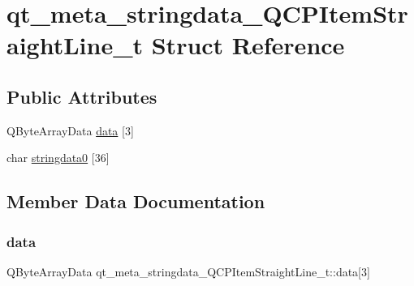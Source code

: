 \hypertarget{structqt__meta__stringdata__QCPItemStraightLine__t}{}\section{qt\+\_\+meta\+\_\+stringdata\+\_\+\+Q\+C\+P\+Item\+Straight\+Line\+\_\+t Struct Reference}
\label{structqt__meta__stringdata__QCPItemStraightLine__t}
\subsection*{Public Attributes}
\begin{DoxyCompactItemize}
\item 
Q\+Byte\+Array\+Data \mbox{\hyperlink{structqt__meta__stringdata__QCPItemStraightLine__t_a1b24e360df4ab7c0917a94969f909ba0}{data}} \mbox{[}3\mbox{]}
\item 
char \mbox{\hyperlink{structqt__meta__stringdata__QCPItemStraightLine__t_a0e2c6dce44cbc1e13041b33cd138f25d}{stringdata0}} \mbox{[}36\mbox{]}
\end{DoxyCompactItemize}


\subsection{Member Data Documentation}
\mbox{\label{structqt__meta__stringdata__QCPItemStraightLine__t_a1b24e360df4ab7c0917a94969f909ba0}} 
\subsubsection{\texorpdfstring{data}{data}}
{\footnotesize\ttfamily Q\+Byte\+Array\+Data qt\+\_\+meta\+\_\+stringdata\+\_\+\+Q\+C\+P\+Item\+Straight\+Line\+\_\+t\+::data\mbox{[}3\mbox{]}}

\mbox{\label{structqt__meta__stringdata__QCPItemStraightLine__t_a0e2c6dce44cbc1e13041b33cd138f25d}} 
